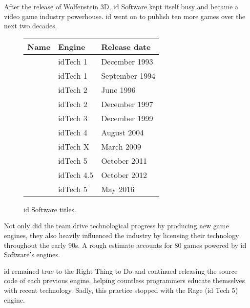 After the release of Wolfenstein 3D, id Software kept itself busy and became a video game industry powerhouse. id went on to publish ten more games over the next two decades. 
 \begin{figure}[H]
\centering  
\begin{tabularx}{\textwidth}{ X  Y Y }
  \toprule
  \textbf{Name} & \textbf{Engine}  & \textbf{Release date} \\
  \toprule {}\protect\footnotemark & idTech 1 & December 1993 \\ 
            & idTech 1 & September 1994 \\ 
            & idTech 2 &June 1996 \\ 
            & idTech 2 & December 1997 \\ 
            &  idTech 3 & December 1999 \\ 
            &  idTech 4 & August 2004 \\ 
            &  idTech X & March 2009 \\ 
            &  idTech 5 & October 2011 \\ 
            &  idTech 4.5\protect\footnotemark & October 2012 \\ 
            &  idTech 5 & May 2016 \\ 
  \toprule
\end{tabularx}
\caption{id Software titles.}\label{fig:vga_history}
\end{figure}
\par
{}
Not only did the team drive technological progress by producing new game engines, they also heavily influenced the industry by licensing their technology throughout the early 90s. A rough estimate accounts for 80 games powered by id Software's engines.\\
\par
id remained true to the Right Thing to Do and continued releasing the source code of each previous engine, helping countless programmers educate themselves with recent technology. Sadly, this practice stopped with the Rage (id Tech 5) engine.
\par
